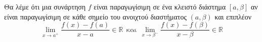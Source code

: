 Θα λέμε ότι μια συνάρτηση $ f $ είναι παραγωγίσιμη σε ένα κλειστό διάστημα $ [a,\beta] $ αν είναι παραγωγίσιμη σε κάθε σημείο του ανοιχτού διαστήματος $ (a,\beta) $ και επιπλέον
\[ \lim_{x\to a^+}{\frac{f(x)-f(a)}{x-a}}\in\mathbb{R}\ \ \textrm{και}\ \ \lim_{x\to \beta^-}{\frac{f(x)-f(\beta)}{x-\beta}}\in\mathbb{R} \]
